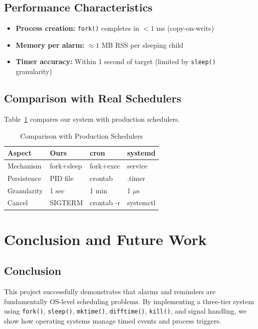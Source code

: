 \documentclass[conference]{IEEEtran}
\begin{document}
\subsection{Performance Characteristics}

\begin{itemize}
    \item \textbf{Process creation:} \texttt{fork()} completes in $< 1$ ms (copy-on-write)
    \item \textbf{Memory per alarm:} $\approx 1$ MB RSS per sleeping child
    \item \textbf{Timer accuracy:} Within 1 second of target (limited by \texttt{sleep()} granularity)
\end{itemize}

\subsection{Comparison with Real Schedulers}

Table~\ref{tab:comparison} compares our system with production schedulers.

\begin{table}[h]
\centering
\caption{Comparison with Production Schedulers}
\label{tab:comparison}
\begin{tabular}{llll}
\toprule
\textbf{Aspect} & \textbf{Ours} & \textbf{cron} & \textbf{systemd} \\
\midrule
Mechanism & fork+sleep & fork+exec & service \\
Persistence & PID file & crontab & .timer \\
Granularity & 1 sec & 1 min & 1 $\mu$s \\
Cancel & SIGTERM & crontab -r & systemctl \\
\bottomrule
\end{tabular}
\end{table}

\section{Conclusion and Future Work}

\subsection{Conclusion}

This project successfully demonstrates that alarms and reminders are fundamentally OS-level scheduling problems. By implementing a three-tier system using \texttt{fork()}, \texttt{sleep()}, \texttt{mktime()}, \texttt{difftime()}, \texttt{kill()}, and signal handling, we show how operating systems manage timed events and process triggers.
\end{document}
